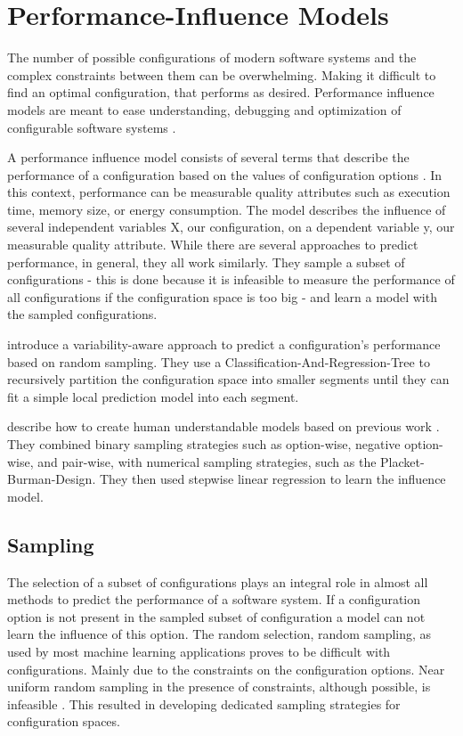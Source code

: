 \documentclass[../../thesis.tex]{subfiles}
\begin{document}
\section{Performance-Influence Models}

The number of possible configurations of modern software systems and the complex constraints between them can be overwhelming.
Making it difficult to find an optimal configuration, that performs as desired. Performance influence models
are meant to ease understanding, debugging and optimization of configurable software systems \cite{siegmund2015performance}.

A performance influence model consists of several terms that describe the performance of a configuration
based on the values of configuration options \cite{siegmund2015performance}. In this context, performance 
can be measurable quality attributes such as execution time, memory size, or energy consumption.
The model describes the influence of several independent variables X, our configuration, on
a dependent variable y, our measurable quality attribute.
While there are several approaches to predict performance, in general, they all work similarly.
They sample a subset of configurations - this is done because it is infeasible to measure the performance
of all configurations if the configuration space is too big -
and learn a model with the sampled configurations.

\citet{guo2013variability} introduce a variability-aware approach to predict a configuration's performance based on random sampling.
They use a Classification-And-Regression-Tree \cite{loh2011classification} to recursively partition the configuration space into
smaller segments until they can fit a simple local prediction model into each segment.

 describe how to create human understandable models based on previous work \cite{siegmund2012predicting}.
They combined binary sampling strategies such as option-wise, negative option-wise, and pair-wise, with numerical sampling strategies, such as the
Placket-Burman-Design. They then used stepwise linear regression to learn the influence model.



\subsection{Sampling}\label{sec:basics:sampling}
The selection of a subset of configurations plays an integral role in almost all methods to
predict the performance of a software system. If a configuration option is not present in the
sampled subset of configuration a model can not learn the influence of this option.
The random selection, random sampling, as used by most
machine learning applications proves to be difficult with configurations. Mainly due to the constraints
on the configuration options. Near uniform random sampling in the presence of constraints, although
possible, is infeasible \cite{supratik2014distribution}.
This resulted in developing dedicated sampling strategies for configuration spaces.
\end{document}
